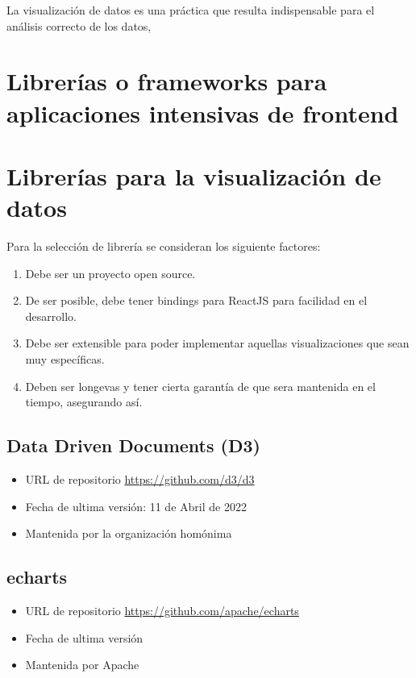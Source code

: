 La visualización de datos es una práctica que resulta indispensable para el análisis correcto de los datos, 



\section{Librerías o frameworks para aplicaciones intensivas de frontend}

\section{Librerías para la visualización de datos}
Para la selección de librería se consideran los siguiente factores:

\begin{enumerate}
    \item {Debe ser un proyecto open source.}
    \item {De ser posible, debe tener bindings para ReactJS para facilidad en el desarrollo.}
    \item {Debe ser extensible para poder implementar aquellas visualizaciones que sean muy específicas.}
    \item {Deben ser longevas y tener cierta garantía de que sera mantenida en el tiempo, asegurando así.}
\end{enumerate}

\subsection{ Data Driven Documents (D3) }
\begin{itemize}
    \item URL de repositorio \href{https://github.com/d3/d3}{https://github.com/d3/d3}
    \item Fecha de ultima versión: 11 de Abril de 2022
    \item Mantenida por la organización homónima
\end{itemize}

\subsection{ echarts }
\begin{itemize}
    \item URL de repositorio \href{https://github.com/apache/echarts}{https://github.com/apache/echarts}
    \item Fecha de ultima versión
    \item Mantenida por Apache
\end{itemize}

